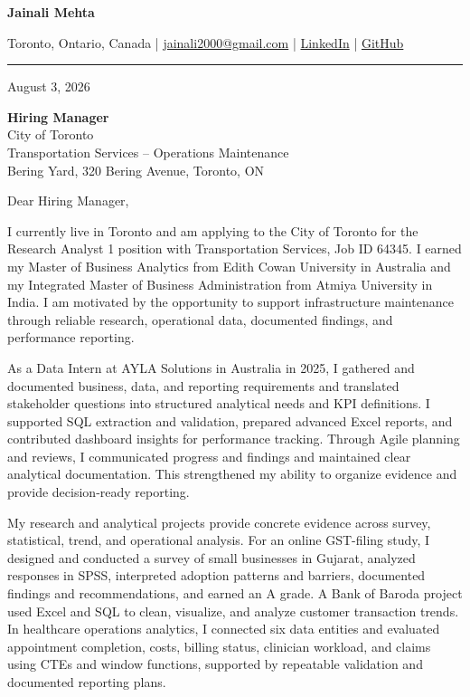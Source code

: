 \documentclass[letterpaper,10pt]{article}
\begin{document}
\begin{center}
  {\fontsize{17}{19}\selectfont\textbf{Jainali Mehta}}\par\vspace{2pt}
  \small Toronto, Ontario, Canada \;|\;
  \href{mailto:jainali2000@gmail.com}{jainali2000@gmail.com} \;|\;
  \href{https://www.linkedin.com/in/jainali-mehta}{LinkedIn} \;|\;
  \href{https://github.com/jainalimehta}{GitHub}
\end{center}
\vspace{-5pt}
\noindent\rule{\textwidth}{0.4pt}

August 3, 2026

\textbf{Hiring Manager}\\
City of Toronto\\
Transportation Services -- Operations Maintenance\\
Bering Yard, 320 Bering Avenue, Toronto, ON

Dear Hiring Manager,

I currently live in Toronto and am applying to the City of Toronto for the Research Analyst 1 position with Transportation Services, Job ID 64345. I earned my Master of Business Analytics from Edith Cowan University in Australia and my Integrated Master of Business Administration from Atmiya University in India. I am motivated by the opportunity to support infrastructure maintenance through reliable research, operational data, documented findings, and performance reporting.

As a Data Intern at AYLA Solutions in Australia in 2025, I gathered and documented business, data, and reporting requirements and translated stakeholder questions into structured analytical needs and KPI definitions. I supported SQL extraction and validation, prepared advanced Excel reports, and contributed dashboard insights for performance tracking. Through Agile planning and reviews, I communicated progress and findings and maintained clear analytical documentation. This strengthened my ability to organize evidence and provide decision-ready reporting.

My research and analytical projects provide concrete evidence across survey, statistical, trend, and operational analysis. For an online GST-filing study, I designed and conducted a survey of small businesses in Gujarat, analyzed responses in SPSS, interpreted adoption patterns and barriers, documented findings and recommendations, and earned an A grade. A Bank of Baroda project used Excel and SQL to clean, visualize, and analyze customer transaction trends. In healthcare operations analytics, I connected six data entities and evaluated appointment completion, costs, billing status, clinician workload, and claims using CTEs and window functions, supported by repeatable validation and documented reporting plans.
\end{document}
